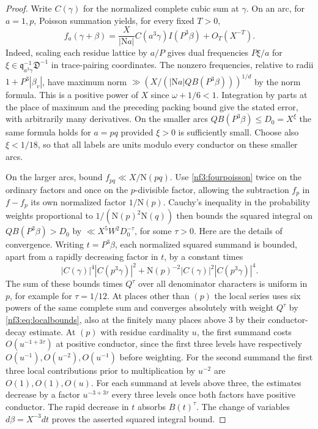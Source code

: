 \documentclass[11pt,letterpaper]{article}
\theoremstyle{definition}
\numberwithin{equation}{section}
\begin{document}
\begin{proof}
Write $C(\gamma)$ for the normalized complete cubic sum at $\gamma$.
On an arc, for $a=1,p$, Poisson summation yields, for every fixed $T>0$,
\begin{equation}\label{nf3:fourpoisson}
 f_a(\gamma+\beta)
   =\frac{X}{|\mathrm N a|}C(a^3\gamma) I(P^3\beta)+O_T(X^{-T}).
\end{equation}
Indeed, scaling each residue lattice by $a/P$ gives dual frequencies
$P\xi/a$ for $\xi\in\mathfrak q_{a^3\gamma}^{-1}\mathfrak D^{-1}$
in trace-pairing coordinates. The nonzero frequencies, relative to
radii $1+P^3|\beta_v|$, have maximum norm
$\gg(X/(|\mathrm Na|Q B(P^3\beta)))^{1/d}$ by the norm formula.
This is a positive power of $X$ since $\omega+1/6<1$.
Integration by parts at the place of maximum and the preceding packing
bound give the stated error, with arbitrarily many derivatives. On the
smaller arcs $QB(P^3\beta)\le D_0=X^\xi$ the same formula holds for $a=pq$
provided $\xi>0$ is sufficiently small. Choose also $\xi<1/18$, so that
all labels are units modulo every conductor on these smaller arcs.

On the larger arcs, bound $f_{pq}\ll X/\mathrm N(pq)$. Use
\eqref{nf3:fourpoisson} twice on the ordinary factors and once on the
$p$-divisible factor, allowing the subtraction $f_p$ in $f-f_p$ its own
normalized factor $1/\mathrm N(p)$. Cauchy's inequality in the
probability weights proportional to $1/(\mathrm N(p)^2\mathrm N(q))$
then bounds the squared integral on $QB(P^3\beta)>D_0$ by
$\ll X^5W^2D_0^{-\tau}$, for some $\tau>0$. Here are the details of
convergence. Writing $t=P^3\beta$, each normalized squared summand is
bounded, apart from a rapidly decreasing factor in $t$, by a constant
times
\[
 |C(\gamma)|^4 |C(p^3\gamma)|^2
 +\mathrm N(p)^{-2}|C(\gamma)|^2 |C(p^3\gamma)|^4 .
\]
The sum of these bounds times $Q^\tau$ over all denominator characters
is uniform in $p$, for example for $\tau=1/12$. At places other than $(p)$
the local series uses six powers of the same complete sum and converges
absolutely with weight $Q^\tau$ by \eqref{nf3:eq:localbounds}, also at
the finitely many places above $3$ by their conductor-decay estimate.
At $(p)$ with residue cardinality $u$, the first summand costs
$O(u^{-1+3\tau})$ at positive conductor, since the first three levels
have respectively $O(u^{-1}),O(u^{-2}),O(u^{-1})$ before weighting.
For the second summand the first three local contributions prior to
multiplication by $u^{-2}$ are $O(1),O(1),O(u)$. For each summand at
levels above three, the estimates decrease by a factor $u^{-3+3\tau}$
every three levels once both factors have positive conductor.
The rapid decrease in $t$ absorbs $B(t)^\tau$. The change of variables
$d\beta=X^{-3}dt$ proves the asserted squared integral bound.


\end{proof}
\end{document}
